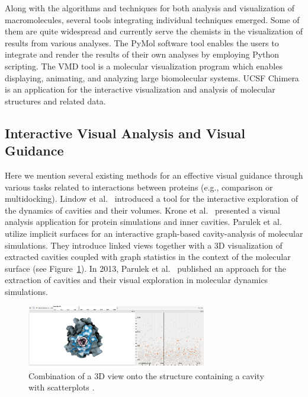 \documentclass[11pt,a4paper,titlepage,oneside,onecolumn]{article}
\begin{document}
Along with the algorithms and techniques for both analysis and visualization of macromolecules, several tools integrating individual techniques emerged. 
Some of them are quite widespread and currently serve the chemists in the visualization of results from various analyses. 
The PyMol software tool \cite{pymol} enables the users to integrate and render the results of their own analyses by employing Python scripting. 
The VMD tool \cite{VMD} is a molecular visualization program which enables displaying, animating, and analyzing large biomolecular systems. 
UCSF Chimera \cite{chimera} is an application for the interactive visualization and analysis of molecular structures and related data. 

\subsection{Interactive Visual Analysis and Visual Guidance}
Here we mention several existing methods for an effective visual guidance through various tasks related to interactions between proteins (e.g., comparison or multidocking). 
Lindow et al.~\cite{Lindow2013} introduced a tool for the interactive exploration of the dynamics of cavities and their volumes.
Krone et al.~\cite{Krone2014} presented a visual analysis application for protein simulations and inner cavities.
Parulek et al.~\cite{parulek2012implicit} utilize implicit surfaces for an interactive graph-based cavity-analysis of molecular simulations. 
They introduce linked views together with a 3D visualization of extracted cavities coupled with graph statistics in the context of the molecular surface (see Figure~\ref{parulek}). 
In 2013, Parulek et al.~\cite{parulek13visualanalysis} published an approach for the extraction of cavities and their visual exploration in molecular dynamics simulations. 

\begin{figure}[ht]
\centering
\includegraphics[width=0.7\textwidth]{pics/parulek2.png}
\caption{Combination of a 3D view onto the structure containing a cavity with scatterplots \cite{parulek2012implicit}.}
\label{parulek}
\end{figure}
\end{document}
